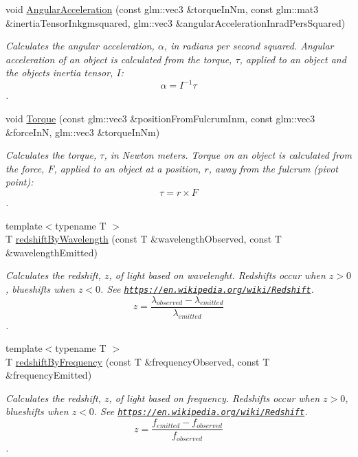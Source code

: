 \begin{DoxyCompactItemize}
void \mbox{\hyperlink{group___e_g_x_phys-_kinetics-_angular_acceleration_gaf636e9a30f3db4e170829efbf40efbbe}{Angular\+Acceleration}} (const glm\+::vec3 \&torque\+In\+Nm, const glm\+::mat3 \&inertia\+Tensor\+Inkgmsquared, glm\+::vec3 \&angular\+Acceleration\+Inrad\+Pers\+Squared)
\begin{DoxyCompactList}\small\item\em Calculates the angular acceleration, $\alpha$, in radians per second squared. Angular acceleration of an object is calculated from the torque, $\tau$, applied to an object and the object\textquotesingle{}s inertia tensor, $I$\+: \[\alpha=I^{-1} \tau \]. \end{DoxyCompactList}\item 
void \mbox{\hyperlink{group___e_g_x_phys-_kinetics-_torque_ga12a787853cab88d40412c8290ca41c61}{Torque}} (const glm\+::vec3 \&position\+From\+Fulcrum\+Inm, const glm\+::vec3 \&force\+InN, glm\+::vec3 \&torque\+In\+Nm)
\begin{DoxyCompactList}\small\item\em Calculates the torque, $\tau$, in Newton meters. Torque on an object is calculated from the force, $F$, applied to an object at a position, $r$, away from the fulcrum (pivot point)\+: \[\tau=r \times F \]. \end{DoxyCompactList}\item 
{\footnotesize template$<$typename T $>$ }\\T \mbox{\hyperlink{group___e_g_x_phys-_optics_ga29300a13e34da35332ca2d447b5ce82d}{redshift\+By\+Wavelength}} (const T \&wavelength\+Observed, const T \&wavelength\+Emitted)
\begin{DoxyCompactList}\small\item\em Calculates the redshift, $z$, of light based on wavelenght. Redshifts occur when $z > 0$, blueshifts when $z < 0$. See \href{https://en.wikipedia.org/wiki/Redshift}{\tt https\+://en.\+wikipedia.\+org/wiki/\+Redshift}. \[z=\frac{\lambda_{observed}-\lambda_{emitted}}{\lambda_{emitted}}\]. \end{DoxyCompactList}\item 
{\footnotesize template$<$typename T $>$ }\\T \mbox{\hyperlink{group___e_g_x_phys-_optics_gacc6d3b2922061214d64b89a4b8e3967a}{redshift\+By\+Frequency}} (const T \&frequency\+Observed, const T \&frequency\+Emitted)
\begin{DoxyCompactList}\small\item\em Calculates the redshift, $z$, of light based on frequency. Redshifts occur when $z > 0$, blueshifts when $z < 0$. See \href{https://en.wikipedia.org/wiki/Redshift}{\tt https\+://en.\+wikipedia.\+org/wiki/\+Redshift}. \[z=\frac{f_{emitted}-f_{observed}}{f_{observed}}\]. \end{DoxyCompactList}\item 

\end{DoxyCompactItemize}
